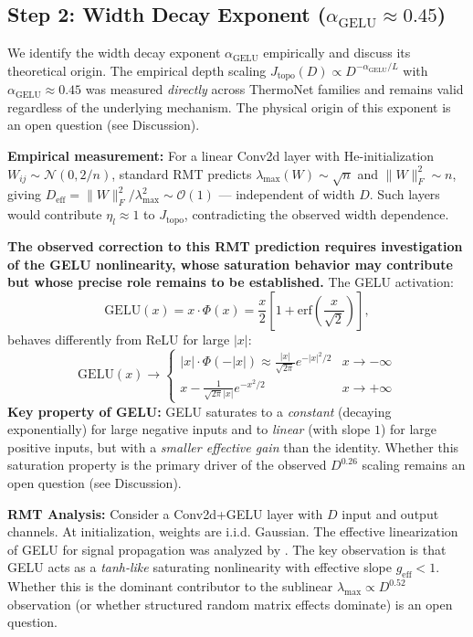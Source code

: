 \documentclass[11pt, a4paper]{article}
\theoremstyle{plain}
\begin{document}
\subsection{Step 2: Width Decay Exponent ($\alpha_{\mathrm{GELU}} \approx 0.45$)}

We identify the width decay exponent $\alpha_{\mathrm{GELU}}$ empirically and discuss its theoretical origin. The empirical depth scaling $J_{\mathrm{topo}}(D) \propto D^{-\alpha_{\mathrm{GELU}}/L}$ with $\alpha_{\mathrm{GELU}} \approx 0.45$ was measured \emph{directly} across ThermoNet families and remains valid regardless of the underlying mechanism. The physical origin of this exponent is an open question (see Discussion).

\medskip\noindent\textbf{Empirical measurement:} For a linear Conv2d layer with He-initialization $W_{ij} \sim \mathcal{N}(0, 2/n)$, standard RMT predicts $\lambda_{\max}(W) \sim \sqrt{n}$ and $\|W\|_F^2 \sim n$, giving $D_{\mathrm{eff}} = \|W\|_F^2 / \lambda_{\max}^2 \sim \mathcal{O}(1)$ --- independent of width $D$. Such layers would contribute $\eta_l \approx 1$ to $J_{\mathrm{topo}}$, contradicting the observed width dependence.

\textbf{The observed correction to this RMT prediction requires investigation of the GELU nonlinearity, whose saturation behavior may contribute but whose precise role remains to be established.} The GELU activation:
\begin{equation}
\mathrm{GELU}(x) = x \cdot \Phi(x) = \frac{x}{2}\left[1 + \mathrm{erf}\left(\frac{x}{\sqrt{2}}\right)\right],
\end{equation}
behaves differently from ReLU for large $|x|$:
\begin{equation}
\mathrm{GELU}(x) \to \begin{cases}
|x| \cdot \Phi(-|x|) \approx \frac{|x|}{\sqrt{2\pi}} e^{-|x|^2/2} & x \to -\infty \\[6pt]
x - \frac{1}{\sqrt{2\pi}|x|} e^{-x^2/2} & x \to +\infty
\end{cases}
\end{equation}
\textbf{Key property of GELU:} GELU saturates to a \emph{constant} (decaying exponentially) for large negative inputs and to \emph{linear} (with slope $1$) for large positive inputs, but with a \emph{smaller effective gain} than the identity. Whether this saturation property is the primary driver of the observed $D^{0.26}$ scaling remains an open question (see Discussion).

\medskip\noindent\textbf{RMT Analysis:} Consider a Conv2d+GELU layer with $D$ input and output channels. At initialization, weights are i.i.d. Gaussian. The effective linearization of GELU for signal propagation was analyzed by \citet{danilov2020noise}. The key observation is that GELU acts as a \emph{tanh-like} saturating nonlinearity with effective slope $g_{\mathrm{eff}} < 1$. Whether this is the dominant contributor to the sublinear $\lambda_{\max} \propto D^{0.52}$ observation (or whether structured random matrix effects dominate) is an open question.
\end{document}
